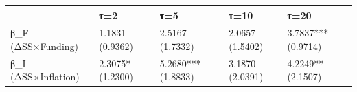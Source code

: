\begin{tabular}{lllll}
\toprule
 & τ=2 & τ=5 & τ=10 & τ=20 \\
\midrule
β_F (ΔSS×Funding) & 1.1831
(0.9362) & 2.5167
(1.7332) & 2.0657
(1.5402) & 3.7837***
(0.9714) \\
β_I (ΔSS×Inflation) & 2.3075*
(1.2300) & 5.2680***
(1.8833) & 3.1870
(2.0391) & 4.2249**
(2.1507) \\
\bottomrule
\end{tabular}

